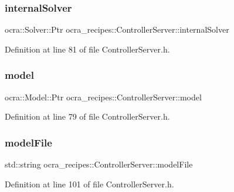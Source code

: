 \subsubsection{\texorpdfstring{internal\+Solver}{internalSolver}}
{\footnotesize\ttfamily ocra\+::\+Solver\+::\+Ptr ocra\+\_\+recipes\+::\+Controller\+Server\+::internal\+Solver\hspace{0.3cm}{\ttfamily [protected]}}



Definition at line 81 of file Controller\+Server.\+h.

\hypertarget{classocra__recipes_1_1ControllerServer_ab239e92da81b48afa2211ef9b25672f3}{}\label{classocra__recipes_1_1ControllerServer_ab239e92da81b48afa2211ef9b25672f3} 
\subsubsection{\texorpdfstring{model}{model}}
{\footnotesize\ttfamily ocra\+::\+Model\+::\+Ptr ocra\+\_\+recipes\+::\+Controller\+Server\+::model\hspace{0.3cm}{\ttfamily [protected]}}



Definition at line 79 of file Controller\+Server.\+h.

\hypertarget{classocra__recipes_1_1ControllerServer_ab077706b924eed4ac5c50e9ade36acf4}{}\label{classocra__recipes_1_1ControllerServer_ab077706b924eed4ac5c50e9ade36acf4} 
\subsubsection{\texorpdfstring{model\+File}{modelFile}}
{\footnotesize\ttfamily std\+::string ocra\+\_\+recipes\+::\+Controller\+Server\+::model\+File\hspace{0.3cm}{\ttfamily [protected]}}



Definition at line 101 of file Controller\+Server.\+h.

\hypertarget{classocra__recipes_1_1ControllerServer_a5c565a9ec45e5fad7b56e9a48609ef3d}{}\label{classocra__recipes_1_1ControllerServer_a5c565a9ec45e5fad7b56e9a48609ef3d} 
